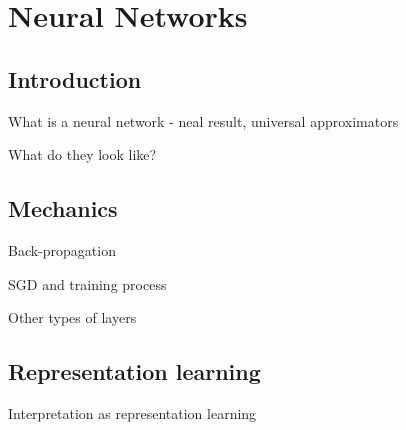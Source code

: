 
\section{Neural Networks}
\subsection{Introduction}
\begin{frame}{What is a neural network}
- neal result, universal approximators
\end{frame}
\begin{frame}{What do they look like?}

\end{frame}
\subsection{Mechanics}
\begin{frame}{Back-propagation}

\end{frame}
\begin{frame}{SGD and training process}

\end{frame}
\begin{frame}{Other types of layers}

\end{frame}
\subsection{Representation learning}
\begin{frame}{Interpretation as representation learning}

\end{frame}

